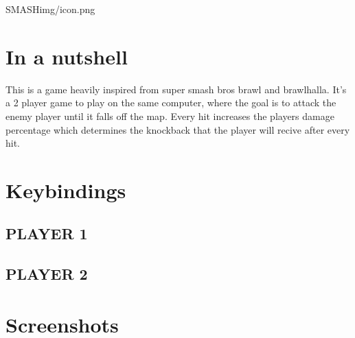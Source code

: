 \documentclass[11pt, a4paper]{article}
\begin{document}
\begin{ManualDocument}{SMASH}{img/icon.png}

    \section*{\textcolor{gameOrange}{In a nutshell}}
    \noindent This is a game heavily inspired from super smash bros brawl and brawlhalla. It's a 2 player game to play on the same computer, where the goal is to attack the enemy player until it falls off the map. Every hit increases the players damage percentage which determines the knockback that the player will recive after every hit.

    
    \section*{\textcolor{gameOrange}{Keybindings}}
    
    \subsection*{PLAYER 1}
    
    \subsection*{PLAYER 2}


    \section*{\textcolor{gameOrange}{Screenshots}}
    
    
\end{ManualDocument}
\end{document}
